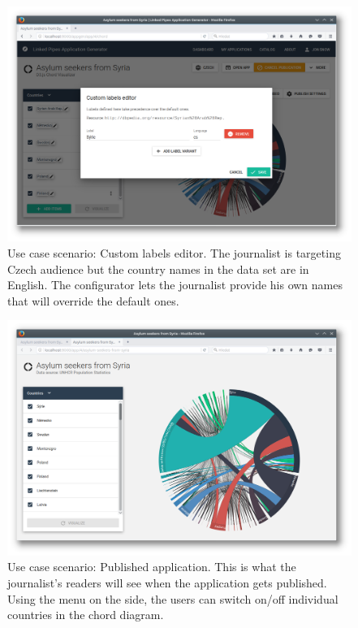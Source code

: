 \begin{figure}
	\centering
	\includegraphics[width=145mm]{img/05_scenario_08_custom_label_editor}
	\caption{Use case scenario: Custom labels editor. The journalist is targeting Czech audience but the country names in the data set are in English. The configurator lets the journalist provide his own names that will override the default ones. }
	\label{fig:scenario-08-custom-label-editor}
\end{figure}

\begin{figure}
	\centering
	\includegraphics[width=145mm]{img/05_scenario_09_published_app}
	\caption{Use case scenario: Published application. This is what the journalist's readers will see when the application gets published. Using the menu on the side, the users can switch on/off individual countries in the chord diagram.}
    \label{fig:scenario-09-published-app}
\end{figure}

